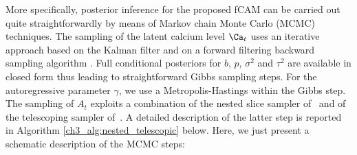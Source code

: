 More specifically, posterior inference for the proposed fCAM can be carried out quite straightforwardly by means of Markov chain Monte Carlo (MCMC) techniques. The sampling of the latent calcium level $\Ca_t$ uses an iterative approach based on the Kalman filter and on a forward filtering backward sampling algorithm \parencite{prado2010}.
Full conditional posteriors for $b$, $p$, $\sigma^2$ and $\tau^2$ are available in closed form thus leading to straightforward Gibbs sampling steps. For the autoregressive parameter $\gamma$, we use a Metropolis-Hastings within the Gibbs step. 
The sampling of $A_t$ exploits a combination of the nested slice sampler of~\textcite{denti2021} and of the telescoping sampler of~\textcite{fruhwirthschnatter2020}. A detailed description of the latter step is reported in Algorithm \ref{ch3_alg:nested_telescopic} below. Here, we just present a schematic description of the MCMC steps:
